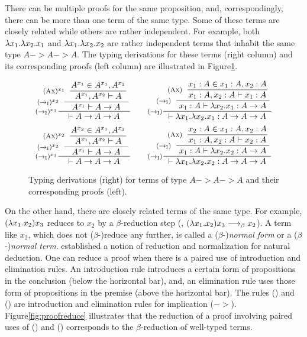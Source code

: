 There can be multiple proofs for the same proposition, and,
correspondingly, there can be more than one term of the same type.
Some of these terms are closely related while others are rather independent.
For example, both $\lambda x_1.\lambda x_2.x_1$ and $\lambda x_1.\lambda x_2.x_2$ are
rather independent terms that inhabit the same type $A -> A -> A$.
The typing derivations for these terms (right column) and
its corresponding proofs (left column) are illustrated in
Figure\;\ref{fig:proofAAA}.
\begin{figure}
\[\setpremisesend{.1em}
\inference[$(->_\textsc{I})^{x_1}$]
	{\hspace*{-3em}
	 \inference[$(->_\textsc{I})^{x_2}$]
	 	{\hspace*{-3em}
		 \inference[$(\textsc{Ax})^{x_1}$]
			{A^{x_1}\in A^{x_1},A^{x_2}}
			{A^{x_1},A^{x_2} |- A} }
		{A^{x_1} |- A -> A} }
	{|- A -> A -> A }
\qquad
\inference[($->_\textsc{I}$)]
	{\hspace*{-1.3em}
	 \inference[($->_\textsc{I}$)]
		{\hspace*{-1.5em}
		 \inference[(\textsc{Ax})]
			{x_1 : A \in x_1 : A, x_2 : A}
			{x_1 : A, x_2 : A |- x_1 : A} }
		{x_1 : A |- \l x_2.x_1 : A -> A} }
	{|- \l x_1.\l x_2.x_1 : A -> A -> A }
\]
\[\setpremisesend{.1em}
\inference[$(->_\textsc{I})^{x_1}$]
	{\hspace*{-3em}
	 \inference[$(->_\textsc{I})^{x_2}$]
		{\hspace*{-3em}
		 \inference[$(\textsc{Ax})^{x_2}$]
			{A^{x_2}\in A^{x_1},A^{x_2}}
			{A^{x_1},A^{x_2} |- A} }
		{A^{x_1} |- A -> A} }
	{|- A -> A -> A }
\qquad
\inference[($->_\textsc{I}$)]
	{\hspace*{-1.3em}
	 \inference[($->_\textsc{I}$)]
		{\hspace*{-1.5em}
		 \inference[(\textsc{Ax})]
			{x_2 : A \in x_1 : A, x_2 : A}
			{x_1 : A, x_2 : A |- x_2 : A} }
		{x_1 : A |- \l x_2.x_2 : A -> A} }
	{|- \l x_1.\l x_2.x_2 : A -> A -> A }
\]
\caption{Typing derivations (right) for terms of type $A -> A -> A$
	and their corresponding proofs (left).}
\label{fig:proofAAA}
\end{figure}

On the other hand, there are closely related terms of the same type.
For example, $(\lambda x_1.x_2) x_3$ reduces to $x_2$ by a $\beta$-reduction step
(\ie, $(\lambda x_1.x_2) x_3 -->_\beta x_2$). A term like $x_2$, which does not
($\beta$-)reduce any further, is called a ($\beta$-)\emph{normal form} or
a ($\beta$-)\emph{normal term}. \citet{Pra65} established a notion of
reduction and normalization for natural deduction. One can reduce a proof
when there is a paired use of introduction and elimination rules.
An introduction rule introduces a certain form of propositions
in the conclusion (below the horizontal bar), and, an elimination rule
uses those form of propositions in the premise (above the horizontal bar).
The rules () and ()
are introduction and elimination rules for implication ($->$).
Figure\;\ref{fig:proofreduce} illustrates that
the reduction of a proof involving paired uses of
() and ()
corresponds to the $\beta$-reduction of well-typed terms.

